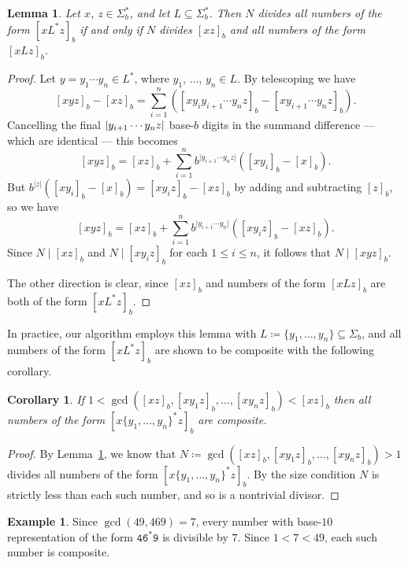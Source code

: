 \documentclass[12pt]{article}
\DeclarePairedDelimiter\abs{\lvert}{\rvert}
\theoremstyle{plain}
\newtheorem{corollary}[theorem]{Corollary}
\newtheorem{lemma}[theorem]{Lemma}
\theoremstyle{definition}
\newtheorem{example}[theorem]{Example}
\newcommand{\0}{\mathtt{0}}
\newcommand{\1}{\mathtt{1}}
\newcommand{\2}{\mathtt{2}}
\newcommand{\3}{\mathtt{3}}
\newcommand{\4}{\mathtt{4}}
\newcommand{\5}{\mathtt{5}}
\newcommand{\6}{\mathtt{6}}
\newcommand{\7}{\mathtt{7}}
\newcommand{\8}{\mathtt{8}}
\newcommand{\9}{\mathtt{9}}
\begin{document}
\begin{lemma}\label{lemone}
Let\/ $x$, $z\in \Sigma^*_b$, and let\/ $L\subseteq\Sigma^*_b$.
Then\/ $N$ divides all numbers of the form\/ $[xL^*z]_b$
if and only if\/ $N$ divides\/ $[xz]_b$ and all numbers of the form\/ $[xLz]_b$.
\end{lemma}
\begin{proof}%
Let $y=y_1\dotsm y_n\in L^*$, where $y_1$, $\dotsc$, $y_n\in L$.  
By telescoping we have
\[ [xyz]_b - [xz]_b = \sum_{i=1}^{n}([xy_{i}y_{i+1}\dotsm y_n z]_b-[xy_{i+1}\dotsm y_n z]_b) . \]
Cancelling the final $\abs{y_{i+1}\dotsm y_nz}$ base-$b$ digits in the summand difference ---
which are identical --- this becomes
\[ [xyz]_b = [xz]_b + \sum_{i=1}^{n}b^{\lvert{y_{i+1}\dotsm y_n z}\rvert}([xy_i]_b-[x]_b) . \]
But $b^{\lvert z\rvert}([xy_i]_b-[x]_b)=[xy_iz]_b-[xz]_b$ by 
adding and subtracting $[z]_b$, so we have
\[ [xyz]_b = [xz]_b + \sum_{i=1}^{n}b^{\vert{y_{i+1}\dotsm y_n}\rvert}([xy_iz]_b-[xz]_b) . \]
Since $N\mid[xz]_b$ and $N\mid[xy_iz]_b$ for each $1\leq i\leq n$,
 it follows that $N\mid[xyz]_b$.
 
The other direction is clear, since $[xz]_b$ and numbers of the 
form $[xLz]_b$ are both of the form $[xL^*z]_b$.
\end{proof}

In practice, our algorithm employs this lemma with 
$L\coloneqq\{y_1,\dotsc,y_n\}\subseteq\Sigma_b$, and all numbers of the form
$[xL^*z]_b$ are shown to be composite with the following corollary.
\begin{corollary}\label{corone}
If\/ $1<\gcd([xz]_b,[xy_1z]_b,\dotsc,[xy_nz]_b)<[xz]_b$
 then all numbers of the form\/ $[x\{y_1,\dotsc,y_n\}^*z]_b$ are composite.
\end{corollary}
\begin{proof}
By Lemma~\ref{lemone}, we know
that $N\coloneqq\gcd([xz]_b,[xy_1z]_b,\dotsc,[xy_nz]_b)>1$ 
divides all numbers of the form $[x\{y_1,\dotsc,y_n\}^*z]_b$.
By the size condition $N$ is strictly less than each such number, and
so is a nontrivial divisor.
\end{proof}

\begin{example}
Since $\gcd(49, 469)=7$, every number with base-$10$ representation
of the form $\4\6^*\9$ is 
divisible by $7$.
Since $1 < 7 < 49$, each such number is composite.
\end{example}
\end{document}
